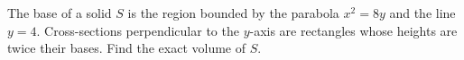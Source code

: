 The base of a solid $S$ is the region bounded by the parabola $x^2=8y$ and the line $y=4$. Cross-sections perpendicular to the $y$-axis are rectangles whose heights are twice their bases. Find the exact volume of $S$.
